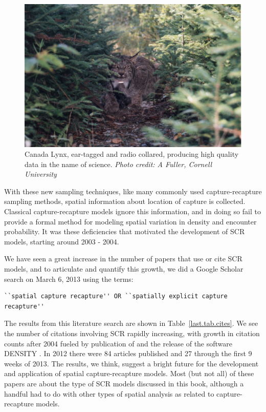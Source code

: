 \begin{figure}[h!]
\centering
\includegraphics[width=\textwidth]{Ch20-Last/lynx.jpg}
\caption{
Canada Lynx, ear-tagged and radio collared, producing high quality
data in the name of science.
{\it Photo credit: A Fuller, Cornell University} }
\label{last.fig.lynx}
\end{figure}

With these new sampling techniques, like many commonly used
capture-recapture sampling methods, spatial information about location
of capture is collected.  Classical capture-recapture models ignore
this information, and in doing so fail to provide a formal method for
modeling spatial variation in density and encounter probability.  It
was these deficiencies that motivated the development of SCR models,
starting around 2003 - 2004.

We have seen a great increase in the number of papers that use or cite
SCR models, and to articulate and quantify this growth, we did a
Google Scholar search on March 6, 2013 using the terms:
\begin{small}
\begin{verbatim}
``spatial capture recapture'' OR ``spatially explicit capture recapture''
\end{verbatim}
\end{small}
The results from this literature search are shown in
Table~\ref{last.tab.cites}.  We see the number of citations involving
SCR rapidly increasing, with growth in citation counts after 2004
fueled by publication of \citet{efford:2004} and the release of the
software DENSITY \citep{efford_etal:2004}. In 2012 there were 84
articles published and 27 through the first 9 weeks of 2013.  The
results, we think, suggest a bright future for the development and
application of spatial capture-recapture models. Most (but not all) of
these papers are about the type of SCR models discussed in this book,
although a handful had to do with other types of spatial analysis as
related to capture-recapture models.

